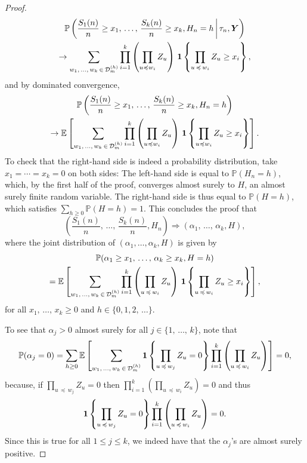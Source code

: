 \documentclass[10pt]{amsart}
\theoremstyle{definition}\newtheorem{defi}[theo]{Definition}\newtheorem{rema}[theo]{Remark}\newtheorem{exam}[theo]{Example}\newtheorem{exem}[theo]{Example}\newtheorem{nota}[theo]{Notation}
\newcommand{\bs}{\ensuremath{\boldsymbol}}
\newcommand{\sss}{\ensuremath{\scriptscriptstyle}}
\newcommand{\bbP}{\mathbb{P}}
\newcommand{\bbE}{\mathbb{E}}
\newcommand{\clD}{\mathcal{D}}
\begin{document}
\begin{proof}
\begin{multline*}
\bbP\left(\frac{S_1(n)}n\geq x_1,\,\ldots,\, \frac{S_k(n)}n\geq x_k, H_n = h \,\middle|\,\tau_n, \bs Y\right) \\
\to \sum_{w_1,\,\ldots,\,w_k\,\in\,\clD_m^{\sss (h)}}
\prod_{i=1}^k \left(\prod_{u\preccurlyeq w_i} Z_u\right)\,\bs 1\left\{\prod_{u\,\preccurlyeq\,w_i} Z_u\geq x_i \right\},
\end{multline*}
and by dominated convergence,
\begin{multline*}
\bbP\left(\frac{S_1(n)}n\geq x_1,\,\ldots,\,\frac{S_k(n)}n\geq x_k, H_n = h\right) \\
\to \bbE\left[\sum_{w_1,\,\ldots,\,w_k\,\in\,\clD_m^{\sss (h)}}
\prod_{i=1}^k \left(\prod_{u\preccurlyeq w_i} Z_u\right)\,\bs 1\left\{\prod_{u\preccurlyeq w_i} Z_u\geq x_i \right\}\right].
\end{multline*}
To check that the right-hand side is indeed a probability distribution, take $x_1=\cdots = x_k = 0$ on both sides: The left-hand side is equal to $\bbP(H_n = h)$, which, by the first half of the proof, converges almost surely to $H$, an almost surely finite random variable. The right-hand side is thus equal to $\bbP(H = h)$, which satisfies $\sum_{h\geq 0} \bbP(H = h) = 1$. This concludes the proof that
\[
\left(\frac{S_1(n)}n, \,\ldots,\, \frac{S_k(n)}n, H_n\right)
\Rightarrow (\alpha_1,\, \ldots,\, \alpha_k, H),
\]
where the joint distribution of $(\alpha_1, \ldots, \alpha_k, H)$ is given by
\begin{multline*}
\bbP(\alpha_1\geq x_1, \,\ldots,\, \alpha_k\geq x_k, H = h) \\
=\bbE\left[\sum_{w_1, \,\ldots,\, w_k\,\in\,\clD_m^{\sss (h)}}
\prod_{i=1}^k \left(\prod_{u\,\preccurlyeq\,w_i} Z_u\right)\,\bs 1\left\{\prod_{u\,\preccurlyeq\,w_i} Z_u\geq x_i \right\}\right],
\end{multline*}
for all $x_1, \,\ldots,\, x_k\geq 0$ and $h\in\{0, 1, 2,\, \ldots\}$.

To see that $\alpha_j>0$ almost surely for all $j\in\{1, \,\ldots,\, k\}$, note that
\[
\bbP(\alpha_j=0) =\sum_{h\geq 0} \bbE\left[\sum_{w_1, \,\ldots,\, w_k\,\in\,\clD_m^{\sss (h)}}
\bs 1\left\{\prod_{u\,\preccurlyeq\,w_j} Z_u=0\right\}
\prod_{i=1}^k \left(\prod_{u\,\preccurlyeq\,w_i} Z_u\right)\right] =0,
\]
because, if $\prod_{u\,\preccurlyeq\,w_j} Z_u=0$ then $\prod_{i=1}^k (\prod_{u\,\preccurlyeq\,w_i} Z_u)=0$ and thus
\[
\bs 1\left\{\prod_{u\,\preccurlyeq\,w_j} Z_u=0\right\}
\prod_{i=1}^k \left(\prod_{u\,\preccurlyeq\,w_i} Z_u\right)=0.
\]
Since this is true for all $1\leq j\leq k$, we indeed have that the $\alpha_j$'s are almost surely positive.
\end{proof}
\end{document}
